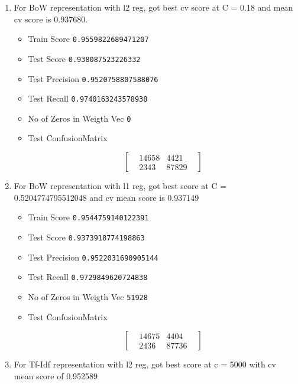 \documentclass[11pt]{article}
\providecommand{\tightlist}{%
      \setlength{\itemsep}{0pt}\setlength{\parskip}{0pt}}
\begin{document}
\begin{enumerate}
\def\labelenumi{\arabic{enumi}.}
\tightlist
\item
  For BoW representation with l2 reg, got best cv score at C = 0.18 and
  mean cv score is 0.937680.

  \begin{itemize}
  \tightlist
  \item
    Train Score \texttt{0.9559822689471207}
  \item
    Test Score \texttt{0.938087523226332}
  \item
    Test Precision \texttt{0.9520758807588076}
  \item
    Test Recall \texttt{0.9740163243578938}
  \item
    No of Zeros in Weigth Vec \texttt{0}
  \item
    Test ConfusionMatrix

    \begin{equation}
       \begin{bmatrix}
    & 14658 & 4421 &  \\
    & 2343 & 87829 & 
      \end{bmatrix}
      \end{equation}
  \end{itemize}
\item
  For BoW representation with l1 reg, got best score at C =
  0.5204774795512048 and cv mean score is 0.937149

  \begin{itemize}
  \tightlist
  \item
    Train Score \texttt{0.9544759140122391}
  \item
    Test Score \texttt{0.9373918774198863}
  \item
    Test Precision \texttt{0.9522031690905144}
  \item
    Test Recall \texttt{0.9729849620724838}
  \item
    No of Zeros in Weigth Vec \texttt{51928}
  \item
    Test ConfusionMatrix

    \begin{equation}
    \begin{bmatrix}
    & 14675 & 4404 &  \\
    & 2436 & 87736 & 
    \end{bmatrix}
    \end{equation}
  \end{itemize}
\item
  For Tf-Idf representation with l2 reg, got best score at c = 5000 with
  cv mean score of 0.952589


\end{enumerate}
\end{document}
